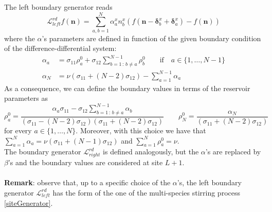 \documentclass[10pt]{article}
\numberwithin{equation}{section}
\numberwithin{equation}{subsection}
\begin{document}
The left boundary generator reads
\begin{equation}
	\mathcal{L}_{left}^{rd}f(\bm{n})=\sum_{a,b=1}^{N}\alpha_{a}^{x}n_{b}^{x}\left(f(\bm{n}-\bm{\delta}_{b}^{x}+\bm{\delta}_{a}^{x})-f(\bm{n})\right)
\end{equation}
where the $\alpha$'s parameters are defined in function of the given boundary condition of the difference-differential system:
\begin{equation}\label{boundaryParamRD}
	\begin{split}
		\alpha_{a}&=\sigma_{11}\rho_{a}^{0}+\sigma_{12}\sum_{b=1\,:\,b\neq a}^{N-1}\rho_{b}^{0}\qquad \text{if} \quad a\in \{1,\ldots,N-1\}\\
		\alpha_{N}&=\nu\left(\sigma_{11}+(N-2)\sigma_{12}\right)-\sum_{a=1}^{N-1}\alpha_{a}
	\end{split}
\end{equation}
As a consequence, we can define the boundary values in terms of the reservoir parameters as
\begin{equation}
	\rho_{a}^{0}=\frac{\alpha_{a}\sigma_{11}-\sigma_{12}\sum_{b=1\,:\,b\neq a}^{N-1}\alpha_{b}}{(\sigma_{11}-(N-2)\sigma_{12})(\sigma_{11}+(N-2)\sigma_{12})}\qquad \rho_{N}^{0}=\frac{\alpha_{N}}{(\sigma_{11}+(N-2)\sigma_{12})}
\end{equation}
for every $a\in\{1,\ldots,N\}$. Moreover, with this choice we have that $\sum_{a=1}^{N}\alpha_{a}=\nu(\sigma_{11}+(N-1)\sigma_{12})$ and $\sum_{a=1}^{N}\rho_{a}^{0}=\nu$. \\
The boundary generator $\mathcal{L}_{right}^{rd}$ is defined analogously, but the $\alpha$'s are replaced by $\beta$'s and the boundary values are considered at site $L+1$. \\ \\
\textbf{Remark}: observe that, up to a specific choice of the $\alpha$'s, the left boundary generator $\mathcal{L}_{left}^{rd}$ has the form of the one of the multi-species stirring process \eqref{siteGenerator}. 
\end{document}
